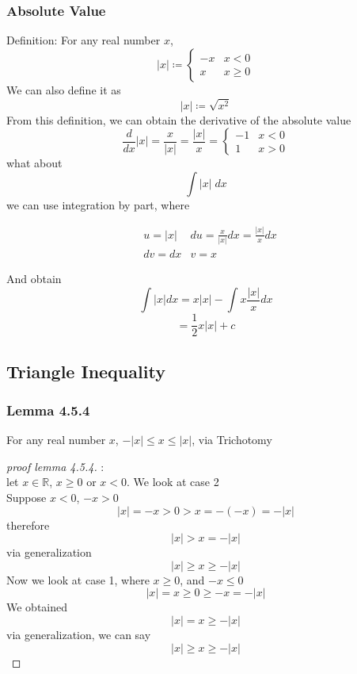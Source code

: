 \documentclass[12pt]{book}
\newcommand{\R}{\mathbb{R}}
\newcommand{\dydx}[2]{\frac{d #1}{d #2}}
\newcommand{\abso}[1]{\left|#1 \right|}
\begin{document}
\subsubsection{Absolute Value}
Definition: For any real number $x$, 
\[
\abso{x} \coloneqq 
\begin{cases}
    -x  & x<0\\
     x  & x\geq 0
\end{cases}
\]
We can also define it as 
\[
\abso{x} \coloneqq \sqrt{x^2}
\]
From this definition, we can obtain the derivative of the absolute value
\[
\dydx{}{x} \abso{x} = \frac{x}{\abso{x}} = \frac{\abso{x}}{x} = 
\begin{cases}
    -1& x<0\\
    1& x>0
\end{cases}
\]
what about 
\[
\int \abso{x} \;dx
\]
we can use integration by part, where
\begin{center}
    \begin{align}
        &u = \abso{x} &du = \frac{x}{\abso{x}} dx= \frac{\abso{x}}{x} dx\\
        &dv = dx & v=x
    \end{align}
\end{center}
And obtain
\[
\int \abso{x} dx = x\abso{x} - \int x \frac{\abso{x}}{x} dx
\]
\[
 = \frac{1}{2} x \abso{x} + c
\]

\newpage

\subsection{Triangle Inequality}
\subsubsection{Lemma 4.5.4}
For any real number $x$, $-\abso{x} \leq x \leq \abso{x}$, via Trichotomy 
\begin{proof}[proof lemma 4.5.4]:\\
let $x \in \R$, $x \geq 0$ or $x < 0$. We look at case 2\\
Suppose $x<0$, $-x>0$
\[
\abso{x} = -x > 0 > x = -(-x) = - \abso{x}
\]
therefore 
\[
\abso{x} > x = -\abso{x}
\]
via generalization
\[
\abso{x} \geq x \geq - \abso{x}
\]
Now we look at case 1, where $x \geq 0$, and $-x \leq 0$
\[
\abso{x} = x \geq 0 \geq -x = -\abso{x}
\]
We obtained
\[
\abso{x} = x \geq -\abso{x}
\]
via generalization, we can say
\[
\abso{x} \geq x \geq -\abso{x}
\]
\end{proof}
\end{document}
